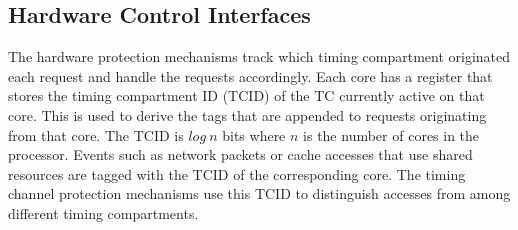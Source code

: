 


\subsection{Hardware Control Interfaces}



The hardware protection mechanisms track which timing compartment originated 
each request and handle the requests accordingly. Each core has a register that 
stores the timing compartment ID (TCID) of the TC currently active on that core. This is used to derive 
the tags that are appended to requests originating from that core. The TCID is 
$log\ n$ bits where $n$ is the number of cores in the processor.
Events such as network packets or cache accesses that use shared resources are 
tagged with the TCID of the corresponding core. 
The timing channel protection mechanisms use this TCID to distinguish accesses
from among different timing compartments.

